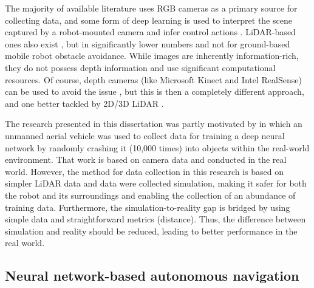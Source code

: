 The majority of available literature uses RGB cameras as a primary source for collecting data, and some form of deep learning is used to interpret the scene captured by a robot-mounted camera and infer control actions \cite{Sullivan2017,Hadsell2009,Giusti2016,Tai2016,Gandhi2017,Liu2017}. LiDAR-based ones also exist \cite{Maturana2015}, but in significantly lower numbers and not for ground-based mobile robot obstacle avoidance. While images are inherently information-rich, they do not possess depth information and use significant computational resources. Of course, depth cameras (like Microsoft Kinect and Intel RealSense) can be used to avoid the issue \cite{Tai2016,Correa2012}, but this is then a completely different approach, and one better tackled by 2D/3D LiDAR \cite{Bousmalis2018}.

The research presented in this dissertation was partly motivated by \cite{Gandhi2017} in which an unmanned aerial vehicle was used to collect data for training a deep neural network by randomly crashing it (10,000 times) into objects within the real-world environment. That work is based on camera data and conducted in the real world. However,  the method for data collection in this research is based on simpler LiDAR data and data were collected simulation, making it safer for both the robot and its surroundings and enabling the collection of an abundance of training data. Furthermore, the simulation-to-reality gap is bridged by using simple data and straightforward metrics (distance). Thus, the difference between simulation and reality should be reduced, leading to better performance in the real world.

\subsection{Neural network-based autonomous navigation}

